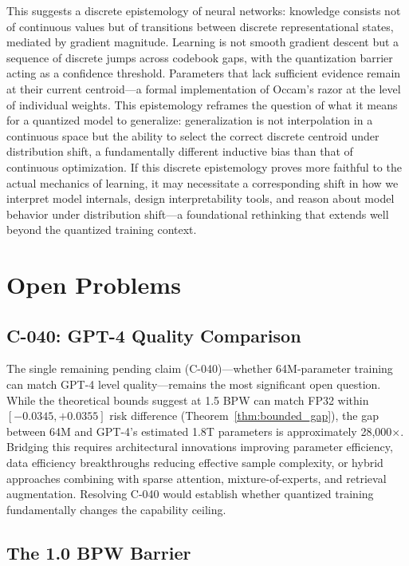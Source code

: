 This suggests a discrete epistemology of neural networks: knowledge consists not of continuous values but of transitions between discrete representational states, mediated by gradient magnitude. Learning is not smooth gradient descent but a sequence of discrete jumps across codebook gaps, with the quantization barrier acting as a confidence threshold. Parameters that lack sufficient evidence remain at their current centroid---a formal implementation of Occam's razor at the level of individual weights. This epistemology reframes the question of what it means for a quantized model to generalize: generalization is not interpolation in a continuous space but the ability to select the correct discrete centroid under distribution shift, a fundamentally different inductive bias than that of continuous optimization. If this discrete epistemology proves more faithful to the actual mechanics of learning, it may necessitate a corresponding shift in how we interpret model internals, design interpretability tools, and reason about model behavior under distribution shift---a foundational rethinking that extends well beyond the quantized training context.

\section{Open Problems}
\label{sec:open_problems}

\subsection{C-040: GPT-4 Quality Comparison}

The single remaining pending claim (C-040)---whether 64M-parameter \OIL{} training can match GPT-4 level quality---remains the most significant open question. While the theoretical bounds suggest \OIL{} at 1.5 BPW can match FP32 within $[-0.0345, +0.0355]$ risk difference (Theorem~\ref{thm:bounded_gap}), the gap between 64M and GPT-4's estimated 1.8T parameters is approximately 28,000$\times$. Bridging this requires architectural innovations improving parameter efficiency, data efficiency breakthroughs reducing effective sample complexity, or hybrid approaches combining \OIL{} with sparse attention, mixture-of-experts, and retrieval augmentation. Resolving C-040 would establish whether quantized training fundamentally changes the capability ceiling.

\subsection{The 1.0 BPW Barrier}

